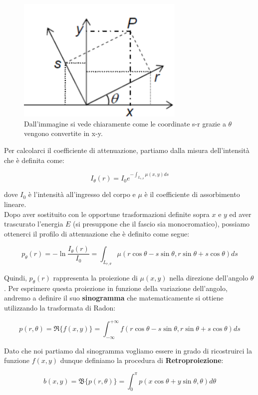 \begin{figure}[H]
    \centering
    \includegraphics[width=8cm, keepaspectratio]{capitoli/immagini/imgs/gantryref.png}
    \caption{Dall'immagine si vede chiaramente come le coordinate s-r grazie a $\theta$ vengono convertite in x-y.}
\end{figure}

Per calcolarci il coefficiente di attenuazione, partiamo dalla misura dell'intensità
che è definita come:

$$
    I_\theta(r) = I_0 e^{-\int_{L_{r,\theta}} \mu(x,y) ds}
$$

dove $I_0$ è l'intensità all'ingresso del corpo e $\mu$ è il coefficiente di assorbimento lineare.\\

Dopo aver sostituito con le opportune trasformazioni definite sopra $x$ e $y$ ed aver
trascurato l'energia $E$ (si presuppone che il fascio sia monocromatico), possiamo
ottenerci il profilo di attenuazione che è definito come segue:

$$
    p_\theta(r) = -\ln \frac{I_\theta(r)}{I_0} = \int_{L_{r, \theta}} \mu(r \cos
    \theta - s \sin \theta, r \sin \theta + s \cos \theta) ds
$$

Quindi, $p_\theta(r)$ rappresenta la proiezione di $\mu(x,y)$ nella direzione
dell'angolo $\theta$. Per esprimere questa proiezione in funzione della variazione
dell'angolo, andremo a definire il suo \textbf{sinogramma} che matematicamente si
ottiene utilizzando la trasformata di Radon:

$$
    p(r, \theta) = \Re \{ f(x,y) \} = \int_{- \infty}^{+ \infty} f(r \cos \theta
    - s \sin \theta, r \sin \theta + s \cos \theta) ds
$$

Dato che noi partiamo dal sinogramma vogliamo essere in grado di ricostruirci la
funzione $f(x,y)$ dunque definiamo la procedura di \textbf{Retroproiezione}:

$$
    b(x,y) = \mathfrak{B} \{p(r, \theta)\} = \int_{0}^{\pi} p(x \cos \theta + y
    \sin \theta, \theta) d\theta
$$

